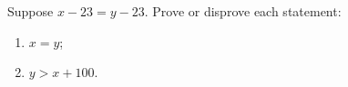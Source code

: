 Suppose $x-23=y-23$. Prove or disprove each statement:
\begin{enumerate}
\item[(a)] $x=y$;
\item[(b)] $y>x+100$.
\end{enumerate}
